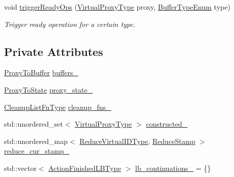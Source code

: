 \begin{DoxyCompactItemize}
void \hyperlink{structvt_1_1vrt_1_1collection_1_1_collection_manager_a8019cad3c48d5697ce22ad4ed853f197}{trigger\+Ready\+Ops} (\hyperlink{namespacevt_a1b417dd5d684f045bb58a0ede70045ac}{Virtual\+Proxy\+Type} proxy, \hyperlink{namespacevt_1_1vrt_1_1collection_a1b1b082e2ff4e9e5d1b7227acd78db3f}{Buffer\+Type\+Enum} type)
\begin{DoxyCompactList}\small\item\em Trigger ready operation for a certain type. \end{DoxyCompactList}\end{DoxyCompactItemize}
\subsection*{Private Attributes}
\begin{DoxyCompactItemize}
\item 
\hyperlink{structvt_1_1vrt_1_1collection_1_1_collection_manager_a8229b3026c5790ed0783bd34c404e359}{Proxy\+To\+Buffer} \hyperlink{structvt_1_1vrt_1_1collection_1_1_collection_manager_aca3063c9343d57284746de0d9f1d9613}{buffers\+\_\+}
\item 
\hyperlink{structvt_1_1vrt_1_1collection_1_1_collection_manager_a47acf9cd5a988ba197fbef5097f75dde}{Proxy\+To\+State} \hyperlink{structvt_1_1vrt_1_1collection_1_1_collection_manager_a5bafa0103098ee13e3b3653431e2657d}{proxy\+\_\+state\+\_\+}
\item 
\hyperlink{structvt_1_1vrt_1_1collection_1_1_collection_manager_a735e54bc5a8646536d07750e2549a156}{Cleanup\+List\+Fn\+Type} \hyperlink{structvt_1_1vrt_1_1collection_1_1_collection_manager_a5123370561fb8eb70ef7c4979e051706}{cleanup\+\_\+fns\+\_\+}
\item 
std\+::unordered\+\_\+set$<$ \hyperlink{namespacevt_a1b417dd5d684f045bb58a0ede70045ac}{Virtual\+Proxy\+Type} $>$ \hyperlink{structvt_1_1vrt_1_1collection_1_1_collection_manager_a0718b47f3415e6d189f8a76068429d5c}{constructed\+\_\+}
\item 
std\+::unordered\+\_\+map$<$ \hyperlink{structvt_1_1vrt_1_1collection_1_1_collection_manager_ae820c8c22ae8c7350fa0232e0749b097}{Reduce\+Virtual\+I\+D\+Type}, \hyperlink{structvt_1_1vrt_1_1collection_1_1_collection_manager_ae8aac19e0ae07e9225142e5880eac830}{Reduce\+Stamp} $>$ \hyperlink{structvt_1_1vrt_1_1collection_1_1_collection_manager_a5bf3bcab36addad323a03746928dfac8}{reduce\+\_\+cur\+\_\+stamp\+\_\+}
\item 
std\+::vector$<$ \hyperlink{structvt_1_1vrt_1_1collection_1_1_collection_manager_a2649daab7b437e1e2bdb5f2eefff29b6}{Action\+Finished\+L\+B\+Type} $>$ \hyperlink{structvt_1_1vrt_1_1collection_1_1_collection_manager_aad857dc811570360f561b1ffc3df1b6c}{lb\+\_\+continuations\+\_\+} = \{\}

\end{DoxyCompactItemize}
